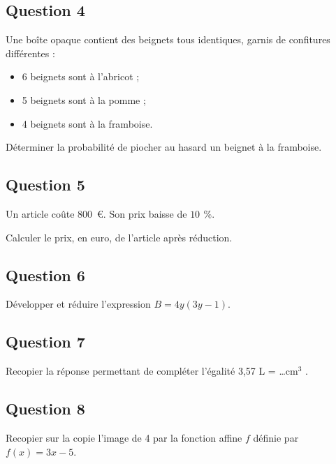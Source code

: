 \subsection*{Question 4}

\medskip

Une boîte opaque contient des beignets tous identiques, garnis de confitures différentes :
\begin{itemize}[label=$\bullet~$]
\item 6 beignets sont à l'abricot ;
\item 5 beignets sont à la pomme ;
\item 4 beignets sont à la framboise.
\end{itemize}

Déterminer la probabilité de piocher au hasard un beignet à la framboise.



\subsection*{Question 5}

\medskip

Un article coûte $800$~\euro{}. Son prix baisse de $10~\,\%$.

Calculer le prix, en euro, de l'article après réduction.



\subsection*{Question 6}

\medskip

Développer et réduire l'expression $B = 4y(3y - 1)$.



\subsection*{Question 7}

\medskip

Recopier la réponse permettant de compléter l'égalité 3,57 L = \ldots cm$^3$
.


\subsection*{Question 8}

\medskip

Recopier sur la copie l'image de 4 par la fonction affine $f$ définie par $f(x) = 3x - 5$.

